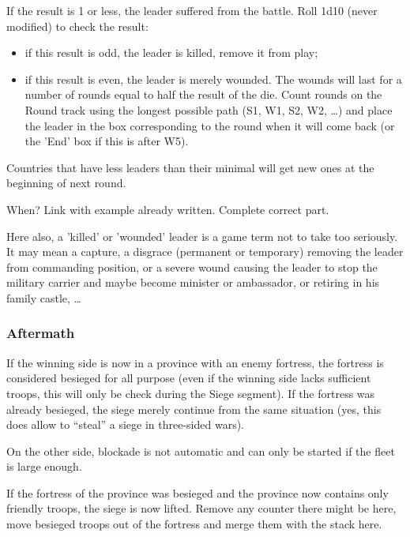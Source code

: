 If the result is 1 or less, the leader suffered from the battle. Roll 1d10
(never modified) to check the result:
\begin{itemize}
\item if this result is odd, the leader is killed, remove it from play;
\item if this result is even, the leader is merely wounded. The wounds will
  last for a number of rounds equal to half the result of the die. Count
  rounds on the Round track using the longest possible path (S1, W1, S2, W2,
  \ldots) and place the leader in the box corresponding to the round when it
  will come back (or the 'End' box if this is after W5).
\end{itemize}

Countries that have less leaders than their minimal will get new ones at the
beginning of next round.
\begin{todo}
  When? Link with example already written. Complete correct part.
\end{todo}

\begin{designnote}
  Here also, a 'killed' or 'wounded' leader is a game term not to take too
  seriously. It may mean a capture, a disgrace (permanent or temporary)
  removing the leader from commanding position, or a severe wound causing the
  leader to stop the military carrier and maybe become minister or ambassador,
  or retiring in his family castle, \ldots
\end{designnote}

\subsubsection{Aftermath}
If the winning side is now in a province with an enemy fortress, the fortress
is considered besieged for all purpose (even if the winning side lacks
sufficient troops, this will only be check during the Siege segment). If the
fortress was already besieged, the siege merely continue from the same
situation (yes, this does allow to ``steal'' a siege in three-sided wars).

On the other side, blockade is not automatic and can only be started if the
fleet is large enough.

If the fortress of the province was besieged and the province now contains
only friendly troops, the siege is now lifted. Remove any \USURE counter there
might be here, move besieged troops out of the fortress and merge them with
the stack here.

